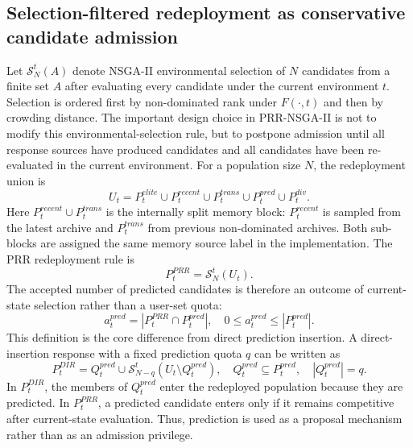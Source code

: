 \documentclass[1p,times]{elsarticle}
\begin{document}
\subsection{Selection-filtered redeployment as conservative candidate admission}
Let $\mathcal{S}^{t}_{N}(A)$ denote NSGA-II environmental selection of $N$ candidates from a finite set $A$ after evaluating every candidate under the current environment $t$. Selection is ordered first by non-dominated rank under $F(\cdot,t)$ and then by crowding distance. The important design choice in PRR-NSGA-II is not to modify this environmental-selection rule, but to postpone admission until all response sources have produced candidates and all candidates have been re-evaluated in the current environment. For a population size $N$, the redeployment union is
\begin{equation}
U_t=P^{elite}_t\cup P^{recent}_t\cup P^{trans}_t\cup P^{pred}_t\cup P^{div}_t.
\end{equation}
Here $P^{recent}_t\cup P^{trans}_t$ is the internally split memory block: $P^{recent}_t$ is sampled from the latest archive and $P^{trans}_t$ from previous non-dominated archives. Both sub-blocks are assigned the same memory source label in the implementation. The PRR redeployment rule is
\begin{equation}
P^{PRR}_t=\mathcal{S}^{t}_{N}(U_t).
\end{equation}
The accepted number of predicted candidates is therefore an outcome of current-state selection rather than a user-set quota:
\begin{equation}
a^{pred}_t=\left|P^{PRR}_t\cap P^{pred}_t\right|,\quad 0\leq a^{pred}_t\leq |P^{pred}_t|.
\end{equation}
This definition is the core difference from direct prediction insertion. A direct-insertion response with a fixed prediction quota $q$ can be written as
\begin{equation}
P^{DIR}_t=Q^{pred}_t\cup \mathcal{S}^{t}_{N-q}\left(U_t\setminus Q^{pred}_t\right),\quad Q^{pred}_t\subseteq P^{pred}_t,\quad |Q^{pred}_t|=q.
\end{equation}
In $P^{DIR}_t$, the members of $Q^{pred}_t$ enter the redeployed population because they are predicted. In $P^{PRR}_t$, a predicted candidate enters only if it remains competitive after current-state evaluation. Thus, prediction is used as a proposal mechanism rather than as an admission privilege.
\end{document}
